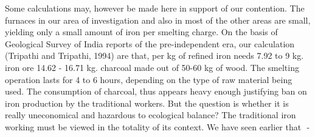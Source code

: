 Some calculations may, however be made here in support of our contention. The furnaces in our area of investigation and also in most of the other areas are small, yielding only a small amount of iron per smelting charge. On the basis of Geological Survey of India reports of the pre-independent era, our calculation (Tripathi and Tripathi, 1994) are that, per kg of refined iron needs 7.92 to 9 kg. iron ore 14.62 - 16.71 kg. charcoal made out of 50-60 kg of wood. The smelting operation lasts for 4 to 6 hours, depending on the type of raw material being used. The consumption of charcoal, thus appears heavy enough justifying ban on iron production by the traditional workers. But the question is whether it is really uneconomical and hazardous to ecological balance? The traditional iron working must be viewed in the totality of its context. We have seen earlier that ­ -

